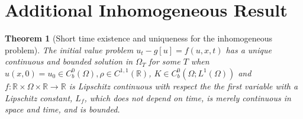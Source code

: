 \documentclass[aps,
preprint,
groupedaddress,
showkeys,
amsmath]{revtex4-2}
\newtheorem{theorem}{Theorem}
\begin{document}
\section{Additional Inhomogeneous Result}\label{APP:AdditionalInhomogeneousResults}
\begin{theorem}[Short time existence and uniqueness for the inhomogeneous problem]The initial value problem $u_t-g[u]=f(u,x,t)$ has a unique continuous and bounded solution in $\Omega_T$ for some $T$ when $u(x,0)=u_0\in C_b^0(\Omega), \rho\in C^{1,1}(\mathbb{R})$, $K\in C^0_b(\Omega;L^1(\Omega))$ and $f:\mathbb{R}\times \Omega\times \mathbb{R}\to \mathbb{R}$ is Lipschitz continuous with respect the the first variable with a Lipschitz constant, $L_f$, which does not depend on time, is merely continuous in space and time, and is bounded. 
\end{theorem}
\end{document}
